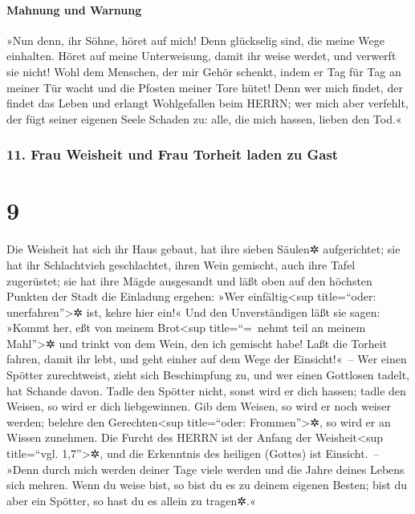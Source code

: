 \hypertarget{mahnung-und-warnung}{%
\paragraph{Mahnung und Warnung}\label{mahnung-und-warnung}}

»Nun denn, ihr Söhne, höret auf mich! Denn glückselig
sind, die meine Wege einhalten. Höret auf meine
Unterweisung, damit ihr weise werdet, und verwerft sie nicht!
Wohl dem Menschen, der mir Gehör schenkt, indem er Tag
für Tag an meiner Tür wacht und die Pfosten meiner Tore hütet!
Denn wer mich findet, der findet das Leben und erlangt
Wohlgefallen beim HERRN; wer mich aber verfehlt, der fügt
seiner eigenen Seele Schaden zu: alle, die mich hassen, lieben den Tod.«

\hypertarget{frau-weisheit-und-frau-torheit-laden-zu-gast}{%
\subsubsection{11. Frau Weisheit und Frau Torheit laden zu
Gast}\label{frau-weisheit-und-frau-torheit-laden-zu-gast}}

\hypertarget{section-8}{%
\section{9}\label{section-8}}

Die Weisheit hat sich ihr Haus gebaut, hat ihre sieben
Säulen✲ aufgerichtet; sie hat ihr Schlachtvieh
geschlachtet, ihren Wein gemischt, auch ihre Tafel zugerüstet;
sie hat ihre Mägde ausgesandt und läßt oben auf den
höchsten Punkten der Stadt die Einladung ergehen: »Wer
einfältig\textless sup title=``oder: unerfahren''\textgreater✲ ist,
kehre hier ein!« Und den Unverständigen läßt sie sagen:
»Kommt her, eßt von meinem Brot\textless sup
title=``=~nehmt teil an meinem Mahl''\textgreater✲ und trinkt von dem
Wein, den ich gemischt habe! Laßt die Torheit fahren,
damit ihr lebt, und geht einher auf dem Wege der Einsicht!«~--
Wer einen Spötter zurechtweist, zieht sich Beschimpfung
zu, und wer einen Gottlosen tadelt, hat Schande davon.
Tadle den Spötter nicht, sonst wird er dich hassen; tadle
den Weisen, so wird er dich liebgewinnen. Gib dem Weisen,
so wird er noch weiser werden; belehre den Gerechten\textless sup
title=``oder: Frommen''\textgreater✲, so wird er an Wissen zunehmen.
Die Furcht des HERRN ist der Anfang der
Weisheit\textless sup title=``vgl. 1,7''\textgreater✲, und die
Erkenntnis des heiligen (Gottes) ist Einsicht.~-- »Denn
durch mich werden deiner Tage viele werden und die Jahre deines Lebens
sich mehren. Wenn du weise bist, so bist du es zu deinem
eigenen Besten; bist du aber ein Spötter, so hast du es allein zu
tragen✲.«

